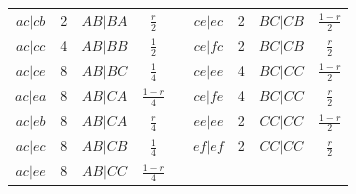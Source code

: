 \documentclass[9pt,letterpaper,twoside]{article}
\begin{document}
{\begin{center}
\begin{tabular}{ccccccccc}
$ac|cb$ & 2 & $AB|BA$ & $\frac{r}{2}$ &&
$ce|ec$ & 2 & $BC|CB$ & $\frac{1-r}{2}$ \\ 
$ac|cc$ & 4 & $AB|BB$ & $\frac{1}{2}$ &&
$ce|fc$ & 2 & $BC|CB$ & $\frac{r}{2}$ \\ 
$ac|ce$ & 8 & $AB|BC$ & $\frac{1}{4}$ &&
$ce|ee$ & 4 & $BC|CC$ & $\frac{1-r}{2}$ \\ 
$ac|ea$ & 8 & $AB|CA$ & $\frac{1-r}{4}$ &&
$ce|fe$ & 4 & $BC|CC$ & $\frac{r}{2}$ \\ 
$ac|eb$ & 8 & $AB|CA$ & $\frac{r}{4}$ &&
$ee|ee$ & 2 & $CC|CC$ & $\frac{1-r}{2}$ \\ 
$ac|ec$ & 8 & $AB|CB$ & $\frac{1}{4}$ &&
$ef|ef$ & 2 & $CC|CC$ & $\frac{r}{2}$ \\ 
\cline{6-9}
$ac|ee$ & 8 & $AB|CC$ & $\frac{1-r}{4}$ &&
& & &\\ 
\cline{1-4}
\end{tabular} \end{center}
}
\end{document}
